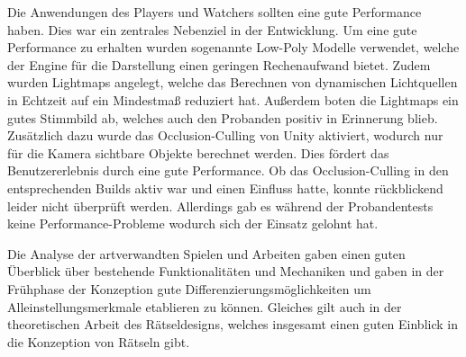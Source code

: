 
Die Anwendungen des Players und Watchers sollten eine gute Performance haben. Dies war ein zentrales Nebenziel in der Entwicklung. Um eine gute Performance zu erhalten wurden sogenannte Low-Poly Modelle verwendet, welche der Engine für die Darstellung einen geringen Rechenaufwand bietet. Zudem wurden Lightmaps angelegt, welche das Berechnen von dynamischen Lichtquellen in Echtzeit auf ein Mindestmaß reduziert hat. Außerdem boten die Lightmaps ein gutes Stimmbild ab, welches auch den Probanden positiv in Erinnerung blieb. Zusätzlich dazu wurde das Occlusion-Culling von Unity aktiviert, wodurch nur für die Kamera sichtbare Objekte berechnet werden. Dies fördert das Benutzererlebnis durch eine gute Performance. Ob das Occlusion-Culling in den entsprechenden Builds aktiv war und einen Einfluss hatte, konnte rückblickend leider nicht überprüft werden. Allerdings gab es während der Probandentests keine Performance-Probleme wodurch sich der Einsatz gelohnt hat.


Die Analyse der artverwandten Spielen und Arbeiten gaben einen guten Überblick über bestehende Funktionalitäten und Mechaniken und gaben in der Frühphase der Konzeption gute Differenzierungsmöglichkeiten um Alleinstellungsmerkmale etablieren zu können. Gleiches gilt auch in der theoretischen Arbeit des Rätseldesigns, welches insgesamt einen guten Einblick in die Konzeption von Rätseln gibt. 


